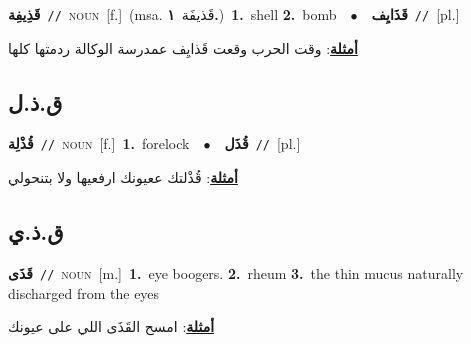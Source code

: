 \documentclass[10pt,a4paper,twoside]{article} %
\begin{document}
\begin{multicols}{2}
{\setlength\topsep{0pt}\textbf{\foreignlanguage{arabic}{قَذِيفِة}}\ {\color{gray}\texttt{//}\color{black}}\ \textsc{noun}\ [f.]\ \color{gray}(msa. \foreignlanguage{arabic}{قَذيفَة}~\foreignlanguage{arabic}{\textbf{١.}})\color{black}\ \textbf{1.}~shell  \textbf{2.}~bomb\ \ $\bullet$\ \ \setlength\topsep{0pt}\textbf{\foreignlanguage{arabic}{قَذَايِف}}\ {\color{gray}\texttt{//}\color{black}}\ [pl.]\  \begin{flushright}\color{gray}\foreignlanguage{arabic}{\textbf{\underline{\foreignlanguage{arabic}{أمثلة}}}: وقت الحرب وقعت قَذايِف عمدرسة الوكالة ردمتها كلها}\end{flushright}\color{black}} \vspace{2mm}

\vspace{-3mm}
\subsection*{\color{blue}\foreignlanguage{arabic}{ق.ذ.ل}\color{blue}{}} 

{\setlength\topsep{0pt}\textbf{\foreignlanguage{arabic}{قُذْلِة}}\ {\color{gray}\texttt{//}\color{black}}\ \textsc{noun}\ [f.]\ \textbf{1.}~forelock\ \ $\bullet$\ \ \setlength\topsep{0pt}\textbf{\foreignlanguage{arabic}{قُذَل}}\ {\color{gray}\texttt{//}\color{black}}\ [pl.]\  \begin{flushright}\color{gray}\foreignlanguage{arabic}{\textbf{\underline{\foreignlanguage{arabic}{أمثلة}}}: قُذْلتك ععيونك ارفعيها ولا بتنحولي}\end{flushright}\color{black}} \vspace{2mm}

\vspace{-3mm}
\subsection*{\color{blue}\foreignlanguage{arabic}{ق.ذ.ي}\color{blue}{}} 

{\setlength\topsep{0pt}\textbf{\foreignlanguage{arabic}{قَذَى}}\ {\color{gray}\texttt{//}\color{black}}\ \textsc{noun}\ [m.]\ \textbf{1.}~eye boogers.  \textbf{2.}~rheum  \textbf{3.}~the thin mucus naturally discharged from the eyes\  \begin{flushright}\color{gray}\foreignlanguage{arabic}{\textbf{\underline{\foreignlanguage{arabic}{أمثلة}}}: امسح القَذَى اللي على عيونك}\end{flushright}\color{black}} \vspace{2mm}


\end{multicols}
\end{document}
